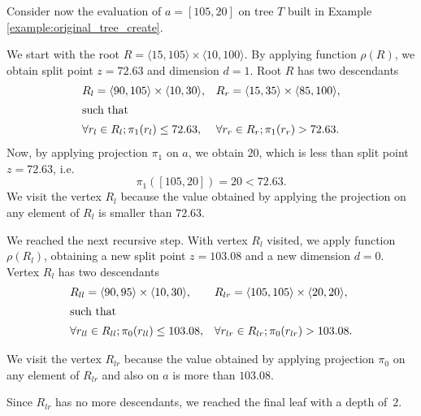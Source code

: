 \begin{example}
\label{ex:regular_point_evaluation_original}
    Consider now the evaluation of $a = [105,20]$ on tree $T$ built in Example \ref{example:original_tree_create}.

    We start with the root $R = \langle 15,105\rangle \times \langle 10, 100 \rangle$.
    By applying function $\rho(R)$, we obtain split point $z = 72.63$ and dimension $d = 1$.
    Root $R$ has two descendants 
\begin{align*}
    &R_l = \langle 90,105\rangle \times \langle 10, 30 \rangle,&
    &R_r = \langle 15,35\rangle \times \langle 85, 100 \rangle,\\
    \intertext{such that}
    &\forall r_l\in R_l; \pi_1(r_l) \le 72.63,&
    &\forall r_r\in R_r; \pi_1(r_r) > 72.63.
\end{align*}
Now, by applying projection $\pi_1$ on $a$, we obtain $20$, which is less than split point $z = 72.63$, i.e.
$$\pi_1([105,20]) = 20 < 72.63.$$
We visit the vertex $R_l$ because the value obtained by applying the projection on any element of $R_l$ is smaller than $72.63$.

We reached the next recursive step. With vertex $R_l$ visited, we apply function $\rho(R_l)$, obtaining a new split point $z = 103.08$ and a new dimension $d = 0$.
Vertex $R_l$ has two descendants 
\begin{align*}
    &R_{ll} = \langle 90,95\rangle \times \langle 10, 30 \rangle,&
    &R_{lr} = \langle 105,105\rangle \times \langle 20,20 \rangle,\\
    \intertext{such that}
    &\forall r_{ll}\in R_{ll}; \pi_0(r_{ll}) \le 103.08,&
    &\forall r_{lr}\in R_{lr}; \pi_0(r_{lr}) > 103.08.
\end{align*}

We visit the vertex $R_{lr}$ because the value obtained by applying projection $\pi_0$ on any element of $R_{lr}$ and also on $a$ is more than $103.08$.

Since $R_{lr}$ has no more descendants, we reached the final leaf with a depth of~$2$.
\end{example}


